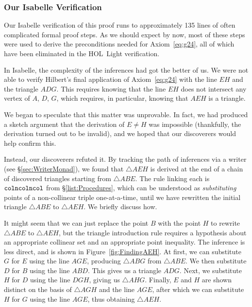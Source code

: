 \subsubsection{Our Isabelle Verification}
Our Isabelle verification of this proof runs to approximately 135 lines of often complicated formal proof steps. As we should expect by now, most of these steps were used to derive the preconditions needed for Axiom~\ref{eq:g24}, all of which have been eliminated in the HOL~Light verification. 

In Isabelle, the complexity of the inferences had got the better of us. We were not able to verify Hilbert's final application of Axiom~\ref{eq:g24} with the line $EH$ and the triangle $ADG$. This requires knowing that the line $EH$ does not intersect any vertex of $A$, $D$, $G$, which requires, in particular, knowing that $AEH$ is a triangle.

We began to speculate that this matter was unprovable. In fact, we had produced a sketch argument that the derivation of $E\neq H$ was impossible (thankfully, the derivation turned out to be invalid), and we hoped that our discoverers would help confirm this.

Instead, our discoverers refuted it. By tracking the path of inferences via a writer (see \S\ref{sec:WriterMonad}), we found that $\triangle AEH$ is derived at the end of a chain of discovered triangles starting from $\triangle ABE$. The rule linking each is $\texttt{colncolncol}$ from \S\ref{list:Procedures}, which can be understood as \emph{substituting} points of a non-collinear triple one-at-a-time, until we have rewritten the initial triangle $\triangle ABE$ to $\triangle AEH$. We briefly discuss how.

It might seem that we can just replace the point $B$ with the point $H$ to rewrite $\triangle ABE$ to $\triangle AEH$, but the triangle introduction rule requires a hypothesis about an appropriate collinear set and an appropriate point inequality. The inference is less direct, and is shown in Figure~\ref{fig:FindingAEH}. At first, we can substitute $G$ for $E$ using the line $AGE$, producing $\triangle ABG$ from $\triangle ABE$. We then substitute $D$ for $B$ using the line $ABD$. This gives us a triangle $ADG$. Next, we substitute $H$ for $D$ using the line $DGH$, giving us $\triangle AHG$. Finally, $E$ and $H$ are shown distinct on the basis of $\triangle AGH$ and the line $AGE$, after which we can substitute $H$ for $G$ using the line $AGE$, thus obtaining $\triangle AEH$.

